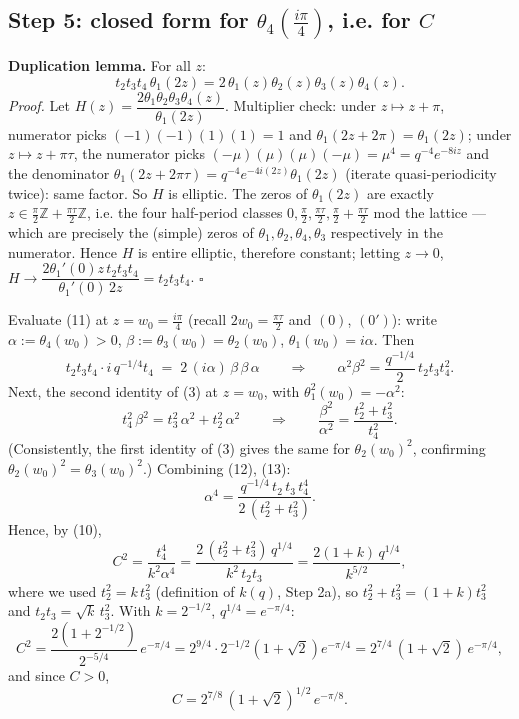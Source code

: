 \documentclass[11pt]{article}
\theoremstyle{remark}
\begin{document}
\subsection*{Step 5: closed form for $\theta_4\!\left(\tfrac{i\pi}4\right)$, i.e. for $C$}

\textbf{Duplication lemma.} For all $z$:
\begin{equation*}
t_2t_3t_4\,\theta_1(2z)=2\,\theta_1(z)\theta_2(z)\theta_3(z)\theta_4(z). \tag{11}
\end{equation*}
\textit{Proof.} Let $H(z)=\dfrac{2\theta_1\theta_2\theta_3\theta_4(z)}{\theta_1(2z)}$. Multiplier check: under $z\mapsto z+\pi$, numerator picks $(-1)(-1)(1)(1)=1$ and $\theta_1(2z+2\pi)=\theta_1(2z)$; under $z\mapsto z+\pi\tau$, the numerator picks $(-\mu)(\mu)(\mu)(-\mu)=\mu^4=q^{-4}e^{-8iz}$ and the denominator $\theta_1(2z+2\pi\tau)=q^{-4}e^{-4i(2z)}\theta_1(2z)$ (iterate quasi-periodicity twice): same factor. So $H$ is elliptic. The zeros of $\theta_1(2z)$ are exactly $z\in\tfrac\pi2\mathbb Z+\tfrac{\pi\tau}2\mathbb Z$, i.e. the four half-period classes $0,\tfrac\pi2,\tfrac{\pi\tau}2,\tfrac\pi2+\tfrac{\pi\tau}2$ mod the lattice --- which are precisely the (simple) zeros of $\theta_1,\theta_2,\theta_4,\theta_3$ respectively in the numerator. Hence $H$ is entire elliptic, therefore constant; letting $z\to0$, $H\to\dfrac{2\theta_1'(0)z\,t_2t_3t_4}{\theta_1'(0)\,2z}=t_2t_3t_4$. $\square$

Evaluate (11) at $z=w_0=\tfrac{i\pi}{4}$ (recall $2w_0=\tfrac{\pi\tau}2$ and $(0)$, $(0')$): write $\alpha:=\theta_4(w_0)>0$, $\beta:=\theta_3(w_0)=\theta_2(w_0)$, $\theta_1(w_0)=i\alpha$. Then
\begin{equation*}
t_2t_3t_4\cdot i\,q^{-1/4}t_4\;=\;2\,(i\alpha)\,\beta\,\beta\,\alpha
\qquad\Longrightarrow\qquad \alpha^2\beta^2=\frac{q^{-1/4}}2\,t_2t_3t_4^2. \tag{12}
\end{equation*}
Next, the second identity of (3) at $z=w_0$, with $\theta_1^2(w_0)=-\alpha^2$:
\begin{equation*}
t_4^2\,\beta^2=t_3^2\,\alpha^2+t_2^2\,\alpha^2\qquad\Longrightarrow\qquad
\frac{\beta^2}{\alpha^2}=\frac{t_2^2+t_3^2}{t_4^2}. \tag{13}
\end{equation*}
(Consistently, the first identity of (3) gives the same for $\theta_2(w_0)^2$, confirming $\theta_2(w_0)^2=\theta_3(w_0)^2$.) Combining (12), (13):
\[\alpha^4=\frac{q^{-1/4}\,t_2\,t_3\,t_4^4}{2\,(t_2^2+t_3^2)} .\]
Hence, by (10),
\[C^2=\frac{t_4^4}{k^2\alpha^4}=\frac{2\,(t_2^2+t_3^2)\,q^{1/4}}{k^2\,t_2t_3}
=\frac{2(1+k)\,q^{1/4}}{k^{5/2}},\]
where we used $t_2^2=k\,t_3^2$ (definition of $k(q)$, Step 2a), so $t_2^2+t_3^2=(1+k)t_3^2$ and $t_2t_3=\sqrt k\,t_3^2$. With $k=2^{-1/2}$, $q^{1/4}=e^{-\pi/4}$:
\[C^2=\frac{2\left(1+2^{-1/2}\right)}{2^{-5/4}}\,e^{-\pi/4}
=2^{9/4}\cdot 2^{-1/2}\left(1+\sqrt2\right)e^{-\pi/4}=2^{7/4}\,(1+\sqrt2)\,e^{-\pi/4},\]
and since $C>0$,
\begin{equation*}
C=2^{7/8}\,(1+\sqrt2)^{1/2}\,e^{-\pi/8}. \tag{14}
\end{equation*}
\end{document}
